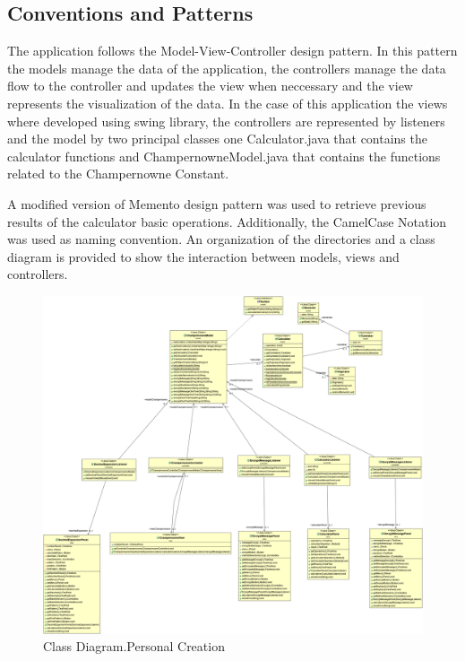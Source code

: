 \documentclass{report}
\begin{document}
\subsection{Conventions and Patterns}

The application follows the Model-View-Controller design pattern. In this pattern the models manage the data of the application, the controllers manage the data flow to the controller and updates the view when neccessary and the view represents the visualization of the data. In the case of this application the views where developed using swing library, the controllers are represented by listeners and the model by two principal classes one Calculator.java that contains the calculator functions and ChampernowneModel.java that contains the functions related to the Champernowne Constant.

A modified version of Memento design pattern was used to retrieve previous results of the calculator basic operations. Additionally, the CamelCase Notation was used as naming convention. An organization of the directories and a class diagram is provided to show the interaction between models, views and controllers. \newline

\begin{figure}[H]
\includegraphics[scale=0.22]{images/ClassDiagramChampernowne.png}
\caption[Class Diagram]{Class Diagram.Personal Creation}
\end{figure}
\end{document}
